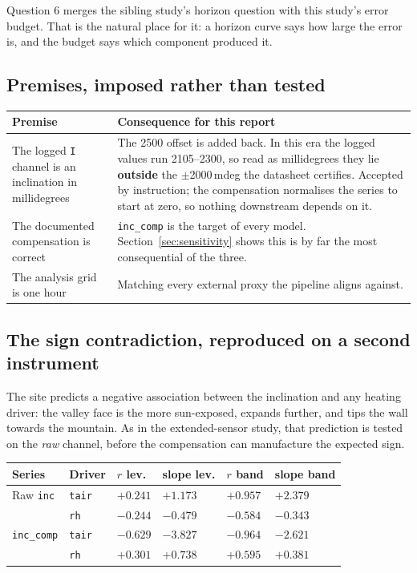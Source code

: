 \documentclass[11pt,a4paper]{article}
\begin{document}
Question 6 merges the sibling study's horizon question with this study's error
budget. That is the natural place for it: a horizon curve says how large the
error is, and the budget says which component produced it.

\subsection{Premises, imposed rather than tested}

\begin{center}
\begin{tabularx}{\textwidth}{L{4.6cm}Y}
\toprule
\textbf{Premise} & \textbf{Consequence for this report} \\
\midrule
The logged \texttt{I} channel is an inclination in millidegrees &
The 2500 offset is added back. In this era the logged values run 2105--2300, so
read as millidegrees they lie \textbf{outside} the $\pm$2000\,mdeg the datasheet
certifies. Accepted by instruction; the compensation normalises the series to
start at zero, so nothing downstream depends on it. \\
The documented compensation is correct &
\texttt{inc\_comp} is the target of every model. Section~\ref{sec:sensitivity}
shows this is by far the most consequential of the three. \\
The analysis grid is one hour &
Matching every external proxy the pipeline aligns against. \\
\bottomrule
\end{tabularx}
\end{center}

\subsection{The sign contradiction, reproduced on a second instrument}
\label{sec:sign}

The site predicts a negative association between the inclination and any heating
driver: the valley face is the more sun-exposed, expands further, and tips the
wall towards the mountain. As in the extended-sensor study, that prediction is
tested on the \emph{raw} channel, before the compensation can manufacture the
expected sign.

\begin{center}
\small
\begin{tabular}{llR{1.4cm}R{1.7cm}R{1.4cm}R{1.7cm}}
\toprule
\textbf{Series} & \textbf{Driver} & \textbf{$r$ lev.} & \textbf{slope lev.} &
\textbf{$r$ band} & \textbf{slope band} \\
\midrule
Raw \texttt{inc}   & \texttt{tair} & $+0.241$ & $+1.173$ & $+0.957$ & $+2.379$ \\
                   & \texttt{rh}   & $-0.244$ & $-0.479$ & $-0.584$ & $-0.343$ \\
\texttt{inc\_comp} & \texttt{tair} & $-0.629$ & $-3.827$ & $-0.964$ & $-2.621$ \\
                   & \texttt{rh}   & $+0.301$ & $+0.738$ & $+0.595$ & $+0.381$ \\
\bottomrule
\end{tabular}
\end{center}
\end{document}
